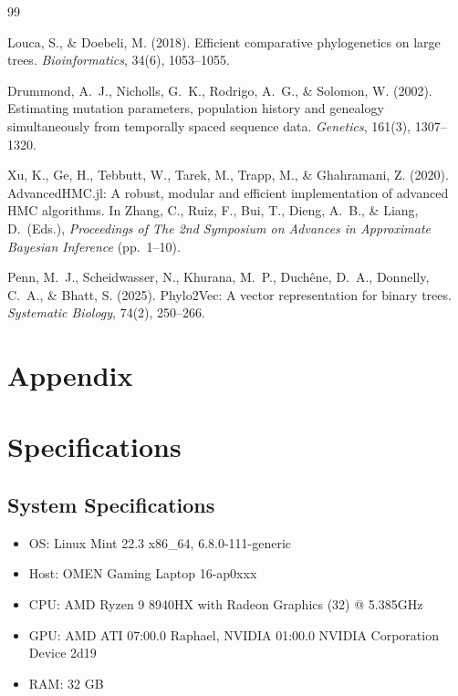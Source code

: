 \documentclass[11pt, a4paper]{article}
\begin{document}
\begin{thebibliography}{99}

Louca, S., \& Doebeli, M. (2018).
Efficient comparative phylogenetics on large trees.
\textit{Bioinformatics}, 34(6), 1053--1055.

Drummond, A.~J., Nicholls, G.~K., Rodrigo, A.~G., \& Solomon, W. (2002).
Estimating mutation parameters, population history and genealogy simultaneously from temporally spaced sequence data.
\textit{Genetics}, 161(3), 1307--1320.

Xu, K., Ge, H., Tebbutt, W., Tarek, M., Trapp, M., \& Ghahramani, Z. (2020).
AdvancedHMC.jl: A robust, modular and efficient implementation of advanced HMC algorithms.
In Zhang, C., Ruiz, F., Bui, T., Dieng, A.~B., \& Liang, D.\ (Eds.),
\textit{Proceedings of The 2nd Symposium on Advances in Approximate Bayesian Inference}
(pp.\ 1--10).

Penn, M.~J., Scheidwasser, N., Khurana, M.~P., Duch\^ene, D.~A., Donnelly, C.~A., \& Bhatt, S. (2025).
Phylo2Vec: A vector representation for binary trees.
\textit{Systematic Biology}, 74(2), 250--266.

\end{thebibliography}

\newpage

\section{Appendix}

\appendix

\section{Specifications}

\subsection{System Specifications}
\begin{itemize}
    \item OS: Linux Mint 22.3 x86\_64, 6.8.0-111-generic 
    \item Host: OMEN Gaming Laptop 16-ap0xxx 
    \item CPU: AMD Ryzen 9 8940HX with Radeon Graphics (32) @ 5.385GHz 
    \item GPU: AMD ATI 07:00.0 Raphael, NVIDIA 01:00.0 NVIDIA Corporation Device 2d19 
    \item RAM: 32 GB
\end{itemize}
\end{document}
